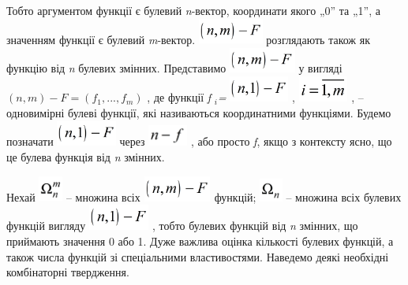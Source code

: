 \documentclass[a4paper]{article}
\newcounter{}
\begin{document}
Тобто аргументом функції є булевий \textit{n}{}-вектор, координати якого „0” та
„1”,  а значенням функції є булевий \textit{m}{}-вектор. 
\includegraphics[width=0.8417in,height=0.3346in]{crypt-img/crypt-img84.png} 
розглядають також як функцію від \textit{n} булевих змінних. Представимо 
\includegraphics[width=0.8618in,height=0.3354in]{crypt-img/crypt-img85.png}  у
вигляді   ${(n,m)-F=(f_{{1}},\text{.}\text{.}\text{.},f_{{m}})}$ ,  де функції
\textit{f} ${{}_{{i}}}$\textit{=}
\includegraphics[width=0.7709in,height=0.3335in]{crypt-img/crypt-img86.png} , 
\includegraphics[width=0.6457in,height=0.3327in]{crypt-img/crypt-img87.png} , –
одновимірні  булеві функції, які називаються координатними функціями. Будемо
позначати 
\includegraphics[width=0.7752in,height=0.3354in]{crypt-img/crypt-img88.png} 
через  
\includegraphics[width=0.5102in,height=0.2709in]{crypt-img/crypt-img89.png}  ,
або просто \textit{f}, якщо з контексту ясно, що це булева функція від
\textit{n} змінних. 

Нехай 
\includegraphics[width=0.3118in,height=0.3335in]{crypt-img/crypt-img90.png}  –
множина всіх 
\includegraphics[width=0.8811in,height=0.3339in]{crypt-img/crypt-img91.png} 
функцій; 
\includegraphics[width=0.2984in,height=0.2984in]{crypt-img/crypt-img92.png}  –
множина всіх булевих функцій вигляду  
\includegraphics[width=0.7866in,height=0.3346in]{crypt-img/crypt-img93.png} ,
тобто булевих функцій від \textit{n }змінних, що приймають значення 0 або 1.
Дуже важлива оцінка кількості  булевих функцій, а також числа функцій зі
спеціальними властивостями. Наведемо деякі необхідні комбінаторні твердження.
\end{document}
